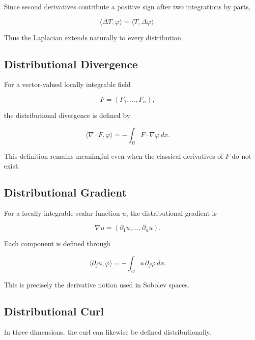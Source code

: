 Since second derivatives contribute a positive sign after two
integrations by parts,

\[
\boxed{
\langle\Delta T,\varphi\rangle
=
\langle T,\Delta\varphi\rangle.
}
\]

Thus the Laplacian extends naturally to every distribution.

\subsection{Distributional Divergence}
\label{subsec:distributional-divergence}

For a vector-valued locally integrable field

\[
F=(F_1,\ldots,F_n),
\]

the distributional divergence is defined by

\[
\boxed{
\langle
\nabla\cdot F,
\varphi
\rangle
=
-
\int_\Omega
F\cdot\nabla\varphi\,dx.
}
\]

This definition remains meaningful even when the classical derivatives
of \(F\) do not exist.

\subsection{Distributional Gradient}
\label{subsec:distributional-gradient}

For a locally integrable scalar function \(u\), the distributional
gradient is

\[
\boxed{
\nabla u
=
(\partial_1u,\ldots,\partial_nu).
}
\]

Each component is defined through

\[
\boxed{
\langle
\partial_ju,\varphi
\rangle
=
-
\int_\Omega
u\,\partial_j\varphi\,dx.
}
\]

This is precisely the derivative notion used in Sobolev spaces.

\subsection{Distributional Curl}
\label{subsec:distributional-curl}

In three dimensions, the curl can likewise be defined distributionally.

